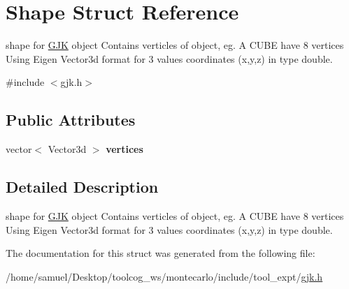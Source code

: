 \hypertarget{structShape}{}\section{Shape Struct Reference}
\label{structShape}


shape for \hyperlink{classGJK}{G\+JK} object Contains verticles of object, eg. A C\+U\+BE have 8 vertices Using Eigen Vector3d format for 3 values coordinates (x,y,z) in type double.  




{\ttfamily \#include $<$gjk.\+h$>$}

\subsection*{Public Attributes}
\begin{DoxyCompactItemize}
\item 
\mbox{\label{structShape_acef16f7c783ae0a1be162d3b3ab2fa8c}} 
vector$<$ Vector3d $>$ {\bfseries vertices}
\end{DoxyCompactItemize}


\subsection{Detailed Description}
shape for \hyperlink{classGJK}{G\+JK} object Contains verticles of object, eg. A C\+U\+BE have 8 vertices Using Eigen Vector3d format for 3 values coordinates (x,y,z) in type double. 

The documentation for this struct was generated from the following file\+:\begin{DoxyCompactItemize}
\item 
/home/samuel/\+Desktop/toolcog\+\_\+ws/montecarlo/include/tool\+\_\+expt/\hyperlink{gjk_8h}{gjk.\+h}\end{DoxyCompactItemize}
